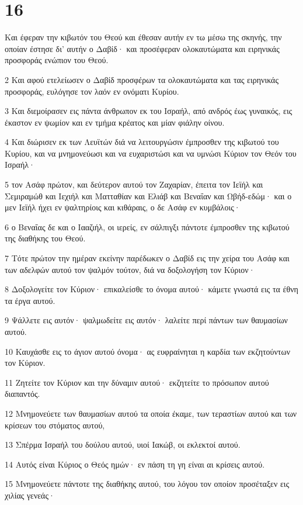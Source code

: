 \chapter{16}

\par Και έφεραν την κιβωτόν του Θεού και έθεσαν αυτήν εν τω μέσω της σκηνής, την οποίαν έστησε δι' αυτήν ο Δαβίδ· και προσέφεραν ολοκαυτώματα και ειρηνικάς προσφοράς ενώπιον του Θεού.
\par 2 Και αφού ετελείωσεν ο Δαβίδ προσφέρων τα ολοκαυτώματα και τας ειρηνικάς προσφοράς, ευλόγησε τον λαόν εν ονόματι Κυρίου.
\par 3 Και διεμοίρασεν εις πάντα άνθρωπον εκ του Ισραήλ, από ανδρός έως γυναικός, εις έκαστον εν ψωμίον και εν τμήμα κρέατος και μίαν φιάλην οίνου.
\par 4 Και διώρισεν εκ των Λευϊτών διά να λειτουργώσιν έμπροσθεν της κιβωτού του Κυρίου, και να μνημονεύωσι και να ευχαριστώσι και να υμνώσι Κύριον τον Θεόν του Ισραήλ·
\par 5 τον Ασάφ πρώτον, και δεύτερον αυτού τον Ζαχαρίαν, έπειτα τον Ιεϊήλ και Σεμιραμώθ και Ιεχιήλ και Ματταθίαν και Ελιάβ και Βεναΐαν και Ωβήδ-εδώμ· και ο μεν Ιεϊήλ ήχει εν ψαλτηρίοις και κιθάραις, ο δε Ασάφ εν κυμβάλοις·
\par 6 ο Βεναΐας δε και ο Ιααζιήλ, οι ιερείς, εν σάλπιγξι πάντοτε έμπροσθεν της κιβωτού της διαθήκης του Θεού.
\par 7 Τότε πρώτον την ημέραν εκείνην παρέδωκεν ο Δαβίδ εις την χείρα του Ασάφ και των αδελφών αυτού τον ψαλμόν τούτον, διά να δοξολογήση τον Κύριον·
\par 8 Δοξολογείτε τον Κύριον· επικαλείσθε το όνομα αυτού· κάμετε γνωστά εις τα έθνη τα έργα αυτού.
\par 9 Ψάλλετε εις αυτόν· ψαλμωδείτε εις αυτόν· λαλείτε περί πάντων των θαυμασίων αυτού.
\par 10 Καυχάσθε εις το άγιον αυτού όνομα· ας ευφραίνηται η καρδία των εκζητούντων τον Κύριον.
\par 11 Ζητείτε τον Κύριον και την δύναμιν αυτού· εκζητείτε το πρόσωπον αυτού διαπαντός.
\par 12 Μνημονεύετε των θαυμασίων αυτού τα οποία έκαμε, των τεραστίων αυτού και των κρίσεων του στόματος αυτού,
\par 13 Σπέρμα Ισραήλ του δούλου αυτού, υιοί Ιακώβ, οι εκλεκτοί αυτού.
\par 14 Αυτός είναι Κύριος ο Θεός ημών· εν πάση τη γη είναι αι κρίσεις αυτού.
\par 15 Μνημονεύετε πάντοτε της διαθήκης αυτού, του λόγου τον οποίον προσέταξεν εις χιλίας γενεάς·
